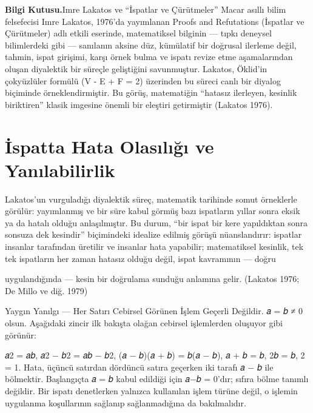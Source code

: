 \begin{tcolorbox}[bookbox,colback=cEx]\textbf{\textsf{\textcolor{cAcc}{Bilgi Kutusu.}}}\quad Imre Lakatos ve “İspatlar ve Çürütmeler” Macar asıllı bilim felsefecisi Imre Lakatos, 1976’da yayımlanan Proofs and Refutations (İspatlar ve Çürütmeler) adlı etkili eserinde, matematiksel bilginin — tıpkı deneysel bilimlerdeki gibi — sanılanın aksine düz, kümülatif bir doğrusal ilerleme değil, tahmin, ispat girişimi, karşı örnek bulma ve ispatı revize etme aşamalarından oluşan diyalektik bir süreçle geliştiğini savunmuştur. Lakatos, Öklid’in çokyüzlüler formülü (V - E + F = 2) üzerinden bu süreci canlı bir diyalog biçiminde örneklendirmiştir. Bu görüş, matematiğin “hatasız ilerleyen, kesinlik biriktiren” klasik imgesine önemli bir eleştiri getirmiştir (Lakatos 1976).\end{tcolorbox}

\section{İspatta Hata Olasılığı ve Yanılabilirlik}\label{sec:hata}

Lakatos’un vurguladığı diyalektik süreç, matematik tarihinde somut örneklerle görülür: yayımlanmış ve bir süre kabul görmüş bazı ispatların yıllar sonra eksik ya da hatalı olduğu anlaşılmıştır. Bu durum, “bir ispat bir kere yapıldıktan sonra sonsuza dek kesindir” biçimindeki idealize edilmiş görüşü nüanslandırır: ispatlar insanlar tarafından üretilir ve insanlar hata yapabilir; matematiksel kesinlik, tek tek ispatların her zaman hatasız olduğu değil, ispat kavramının — doğru

uygulandığında — kesin bir doğrulama sunduğu anlamına gelir. (Lakatos 1976; De Millo ve diğ. 1979)

Yaygın Yanılgı — Her Satırı Cebirsel Görünen İşlem Geçerli Değildir. 𝑎 = 𝑏 ≠ 0 olsun. Aşağıdaki zincir ilk bakışta olağan cebirsel işlemlerden oluşuyor gibi görünür:

𝑎2 = 𝑎𝑏, 𝑎2 − 𝑏2 = 𝑎𝑏 − 𝑏2, (𝑎 − 𝑏)(𝑎 + 𝑏) = 𝑏(𝑎 − 𝑏), 𝑎 + 𝑏 = 𝑏, 2𝑏 = 𝑏, 2 = 1. Hata, üçüncü satırdan dördüncü satıra geçerken iki tarafı 𝑎 − 𝑏 ile bölmektir. Başlangıçta 𝑎 = 𝑏 kabul edildiği için 𝑎−𝑏 = 0’dır; sıfıra bölme tanımlı değildir. Bir ispatı denetlerken yalnızca kullanılan işlem türüne değil, o işlemin uygulanma koşullarının sağlanıp sağlanmadığına da bakılmalıdır.

